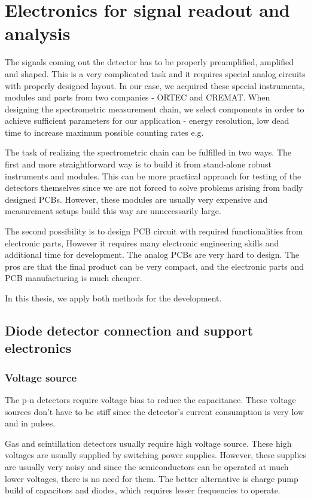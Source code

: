 
\chapter{Electronics for signal readout and analysis}
The signals coming out the detector has to be properly preamplified, amplified and shaped. This is a very complicated task and it requires special analog circuits with properly designed layout. 
In our case, we acquired these special instruments, modules and parts from two companies - ORTEC and CREMAT. When designing the spectrometric measurement chain, we select components in order to achieve sufficient parameters for our application - energy resolution, low dead time to increase maximum possible counting rates e.g. 
\par
The task of realizing the spectrometric chain can be fulfilled in two ways. The first and more straightforward way is to build it from stand-alone robust instruments and modules. This can be more practical approach for testing of the detectors themselves since we are not forced to solve problems arising from badly designed PCBs. However, these modules are usually very expensive and measurement setups build this way are unnecessarily large.
\par
The second possibility is to design PCB circuit with required functionalities from electronic parts, However it requires many electronic engineering skills and additional time for development. The analog PCBs are very hard to design. The pros are that the final product can be very compact, and the electronic parts and PCB manufacturing is much cheaper. 
\par
In this thesis, we apply both methods for the development.



\section{Diode detector connection and support electronics}
\subsection{Voltage source}
The p-n detectors require voltage bias to reduce the capacitance.
These voltage sources don't have to be stiff since the detector's current consumption is very low and in pulses.
\par
Gas and scintillation detectors usually require high voltage source. These high voltages are usually supplied by switching power supplies.
However, these supplies are usually very noisy and since the semiconductors can be operated at much lower voltages, there is no need for them. The better alternative is charge pump build of capacitors and diodes, which requires lesser frequencies to operate.
